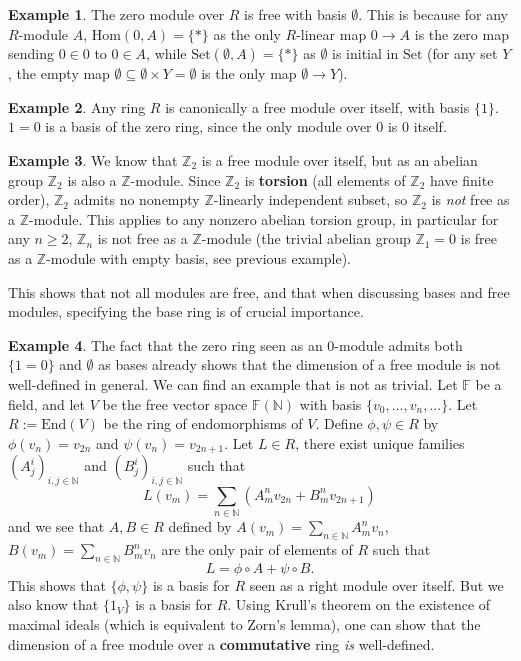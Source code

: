 \documentclass[a4paper,12pt,parskip=half*,chapterprefix=true,numbers=noendperiod]{scrreprt}
\theoremstyle{definition}
\newtheorem{example}{Example}[section]
\theoremstyle{remark}
\begin{document}
\begin{example}
	The zero module over $R$ is free with basis $\emptyset$. This is because for any $R$-module $A$, $\text{Hom}(0,A)=\{*\}$ as the only $R$-linear map $0\to A$ is the zero map sending $0\in 0$ to $0\in A$, while $\text{Set}(\emptyset,A)=\{*\}$ as $\emptyset$ is initial in $\text{Set}$ (for any set $Y$, the empty map $\emptyset\subseteq\emptyset\times Y=\emptyset$ is the only map $\emptyset\to Y$).
\end{example}
\begin{example}
	Any ring $R$ is canonically a free module over itself, with basis $\{1\}$. $1=0$ is a basis of the zero ring, since the only module over $0$ is $0$ itself.
\end{example}
\begin{example}
	We know that $\mathbb{Z}_2$ is a free module over itself, but as an abelian group $\mathbb{Z}_2$ is also a $\mathbb{Z}$-module. Since $\mathbb{Z}_2$ is \textbf{torsion} (all elements of $\mathbb{Z}_2$ have finite order), $\mathbb{Z}_2$ admits no nonempty $\mathbb{Z}$-linearly independent subset, so $\mathbb{Z}_2$ is \emph{not} free as a $\mathbb{Z}$-module. This applies to any nonzero abelian torsion group, in particular for any $n\geq 2$, $\mathbb{Z}_n$ is not free as a $\mathbb{Z}$-module (the trivial abelian group $\mathbb{Z}_1=0$ is free as a $\mathbb{Z}$-module with empty basis, see previous example).
	
	This shows that not all modules are free, and that when discussing bases and free modules, specifying the base ring is of crucial importance.
\end{example}
\begin{example}\label{ex:ModuleDimension}
	The fact that the zero ring seen as an $0$-module admits both $\{1=0\}$ and $\emptyset$ as bases already shows that the dimension of a free module is not well-defined in general. We can find an example that is not as trivial. Let $\mathbb{F}$ be a field, and let $V$ be the free vector space $\mathbb{F}(\mathbb{N})$ with basis $\{v_0,...,v_n,...\}$. Let $R:=\text{End}(V)$ be the ring of endomorphisms of $V$. Define $\phi,\psi\in R$ by $\phi(v_n)=v_{2n}$ and $\psi(v_n)=v_{2n+1}$. Let $L\in R$, there exist unique families $(A^i_j)_{i,j\in\mathbb{N}}$ and $(B^i_j)_{i,j\in\mathbb{N}}$ such that
	\begin{equation*}
		L(v_m)=\sum_{n\in\mathbb{N}}\left(A^n_mv_{2n}+B^n_{m}v_{2n+1}\right)
	\end{equation*}
and we see that $A,B\in R$ defined by $A(v_m)=\sum_{n\in\mathbb{N}}A^n_mv_n$, $B(v_m)=\sum_{n\in\mathbb{N}}B^n_mv_n$ are the only pair of elements of $R$ such that
\begin{equation*}
	L=\phi\circ A+\psi\circ B.
\end{equation*}
	This shows that $\{\phi,\psi\}$ is a basis for $R$ seen as a right module over itself. But we also know that $\{1_V\}$ is a basis for $R$. Using Krull's theorem on the existence of maximal ideals (which is equivalent to Zorn's lemma), one can show that the dimension of a free module over a \textbf{commutative} ring \emph{is} well-defined.
\end{example}
\end{document}
